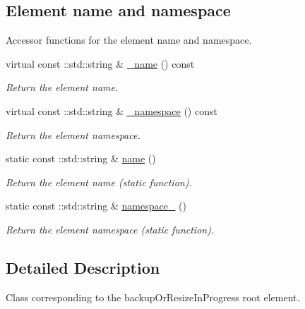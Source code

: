 \subsection*{Element name and namespace}
\label{_amgrpd4b5b61f6e07390f4af2465e04571f34}
Accessor functions for the element name and namespace. \begin{DoxyCompactItemize}
\item 
virtual const ::std::string \& \hyperlink{classopenstack_1_1xml_1_1BackupOrResizeInProgress_a4187f6971bca603ff664c08efb47046f}{\_\-name} () const 
\begin{DoxyCompactList}\small\item\em Return the element name. \item\end{DoxyCompactList}\item 
virtual const ::std::string \& \hyperlink{classopenstack_1_1xml_1_1BackupOrResizeInProgress_a455fa9826625e7f7829ce38c2ab525fe}{\_\-namespace} () const 
\begin{DoxyCompactList}\small\item\em Return the element namespace. \item\end{DoxyCompactList}\item 
static const ::std::string \& \hyperlink{classopenstack_1_1xml_1_1BackupOrResizeInProgress_a0a437027986e2c4a9dd1da05af6f1634}{name} ()
\begin{DoxyCompactList}\small\item\em Return the element name (static function). \item\end{DoxyCompactList}\item 
static const ::std::string \& \hyperlink{classopenstack_1_1xml_1_1BackupOrResizeInProgress_a7211e99281c573936bdd0e8a285efb7f}{namespace\_\-} ()
\begin{DoxyCompactList}\small\item\em Return the element namespace (static function). \item\end{DoxyCompactList}\end{DoxyCompactItemize}


\subsection{Detailed Description}
Class corresponding to the backupOrResizeInProgress root element. 

